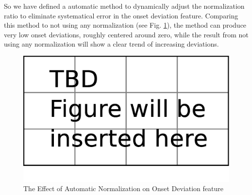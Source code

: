    So we have defined a automatic method to dynamically adjust the normalization ratio to eliminate systematical error in the onset deviation feature. Comparing this method to not using any normalization (see Fig. \ref{fig:afternorm}), the method can produce very low onset deviations, roughly centered around zero, while the result from not using any normalization will show a clear trend of increasing deviations.
\begin{figure}[tp]
   \begin{center}
      \includegraphics[width=\textwidth]{fig/TBDFigure}

   \end{center}
   \caption{The Effect of Automatic Normalization on Onset Deviation feature}
   \label{fig:afternorm}
\end{figure}


